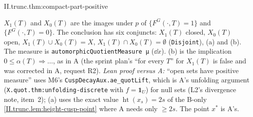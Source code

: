 \begin{tfformal}{II.trunc.thm:compact-part-positive}
\begin{tffidelity}
$X_1(T)$ and $X_0(T)$ are the images under $p$ of $\{F^G(\cdot,T)=1\}$ and $\{F^G(\cdot,T)=0\}$. The conclusion has six conjuncts: $X_1(T)$ closed, $X_0(T)$ open, $X_1(T)\cup X_0(T)=X$, $X_1(T)\cap X_0(T)=\emptyset$ (\texttt{Disjoint}), (a) and (b). The measure is \texttt{automorphicQuotientMeasure μ} ($\dd\dot x$). (b) is the implication $0\le\alpha(T)\Rightarrow\dots$, as in A (the sprint plan's ``for every $T$'' for $X_1(T)$ is false and was corrected in A, request R2). \emph{Lean proof versus A:} ``open sets have positive measure'' uses M6's \texttt{CuspDecayAux.ae\_quotLift}, which is A's unfolding argument (\texttt{X.quot.thm:unfolding-discrete} with $f=\mathbf 1_U$) for null sets (L2's divergence note, item~2); (a) uses the exact value $\operatorname{ht}(x_s)=2s$ of the B-only \cref{II.trunc.lem:height-cusp-point} where A needs only $\ge2s$. The point $x^*$ is A's.
\end{tffidelity}
\end{tfformal}
